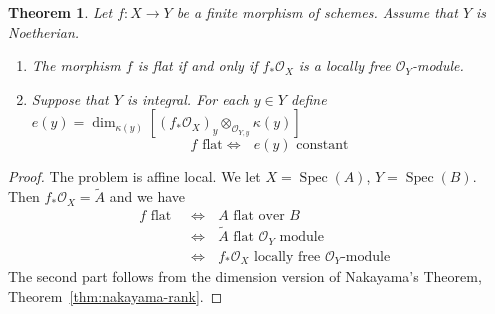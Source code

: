 \documentclass[12pt]{article}
\numberwithin{equation}{section}
\newtheorem{theorem}{Theorem}[subsection]
\theoremstyle{definition}
\theoremstyle{remark}
\newcommand{\Ocal}{\mathcal{O}}
\newcommand{\Spec}{\operatorname{Spec}}
\begin{document}
\begin{theorem}
	Let $f:X\to Y$ be a finite morphism of schemes. 
	Assume that $Y$ is Noetherian. 
	\begin{enumerate}
		\item The morphism $f$ is flat if and only if $f_*\Ocal_X$ is a locally free $\Ocal_Y$-module.
		\item 	Suppose that $Y$ is integral. 
		For each $y\in Y$ define $e(y) = \dim_{\kappa(y)}\left[ (f_*\Ocal_{X})_y \otimes_{\Ocal_{Y,y}}\kappa(y) \right]$
		$$ \mbox{$f$ flat} \iff \mbox{ $e(y)$ constant } $$
	\end{enumerate} 
\end{theorem}
\begin{proof}
	The problem is affine local. 
	We let $X = \Spec(A)$, $Y=\Spec(B)$. 
	Then $f_*\Ocal_X = \widetilde{A}$ and we have 
	\begin{align*}
	\mbox{ $f$ flat }&\iff \mbox{ $A$ flat over $B$ }\\
	& \iff \mbox{ $\widetilde{A}$ flat $\Ocal_Y$ module} \\
	& \iff \mbox{ $f_*\Ocal_X$ locally free $\Ocal_Y$-module}
	\end{align*}
	The second part follows from the dimension version of Nakayama's Theorem, Theorem~\ref{thm:nakayama-rank}.
\end{proof}
\end{document}
